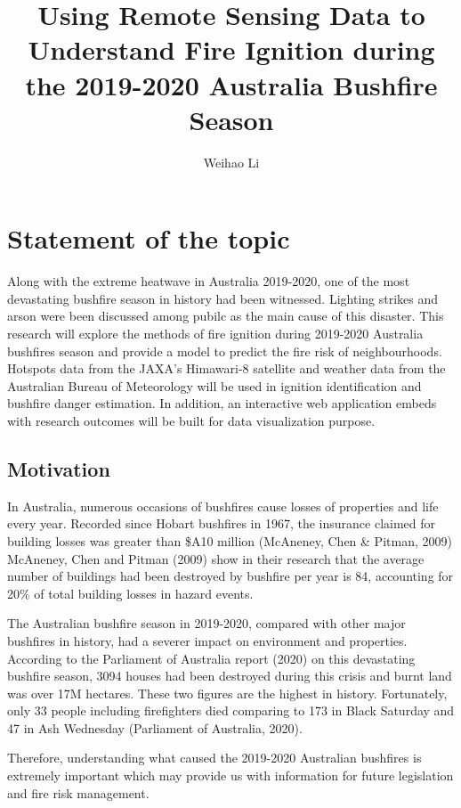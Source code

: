 \documentclass{monashthesis}
\author{Weihao Li}
\title{Using Remote Sensing Data to Understand Fire Ignition during the
2019-2020 Australia Bushfire Season}
\begin{document}

\titlepage

{\sf\tighttoc\doublespacing}

\clearpage{}\setcounter{page}{0}

\chapter{Statement of the topic}\label{ch:intro}

Along with the extreme heatwave in Australia 2019-2020, one of the most
devastating bushfire season in history had been witnessed. Lighting
strikes and arson were been discussed among pubilc as the main cause of
this disaster. This research will explore the methods of fire ignition
during 2019-2020 Australia bushfires season and provide a model to
predict the fire risk of neighbourhoods. Hotspots data from the JAXA's
Himawari-8 satellite and weather data from the Australian Bureau of
Meteorology will be used in ignition identification and bushfire danger
estimation. In addition, an interactive web application embeds with
research outcomes will be built for data visualization purpose.

\section{Motivation}\label{motivation}

In Australia, numerous occasions of bushfires cause losses of properties
and life every year. Recorded since Hobart bushfires in 1967, the
insurance claimed for building losses was greater than \$A10 million
(McAneney, Chen \& Pitman, 2009) McAneney, Chen and Pitman (2009) show
in their research that the average number of buildings had been
destroyed by bushfire per year is 84, accounting for 20\% of total
building losses in hazard events.

The Australian bushfire season in 2019-2020, compared with other major
bushfires in history, had a severer impact on environment and
properties. According to the Parliament of Australia report (2020) on
this devastating bushfire season, 3094 houses had been destroyed during
this crisis and burnt land was over 17M hectares. These two figures are
the highest in history. Fortunately, only 33 people including
firefighters died comparing to 173 in Black Saturday and 47 in Ash
Wednesday (Parliament of Australia, 2020).

Therefore, understanding what caused the 2019-2020 Australian bushfires
is extremely important which may provide us with information for future
legislation and fire risk management.
\end{document}
